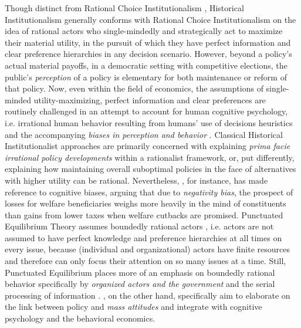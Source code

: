 \documentclass[11pt]{article}
\begin{document}
Though distinct from Rational Choice Institutionalism \parencite[see e.g.][]{Hall1996}, Historical Institutionalism generally conforms with Rational Choice Institutionalism on the idea of rational actors who single-mindedly and strategically act to maximize their material utility, in the pursuit of which they have perfect information and clear preference hierarchies in any decision scenario. However, beyond a policy's actual material payoffs, in a democratic setting with competitive elections, the public's \textit{perception} of a policy is elementary for both maintenance or reform of that policy. Now, even within the field of economics, the assumptions of single-minded utility-maximizing, perfect information and clear preferences are routinely challenged in an attempt to account for human cognitive psychology, i.e. irrational human behavior resulting from humans' use of decisions heuristics and the accompanying \textit{biases in perception and behavior} \parencite[see e.g.][]{Kahnemann1982}. Classical Historical Institutionalist approaches \parencite[e.g.][]{Pierson2000} are primarily concerned with explaining \textit{prima facie irrational policy developments} within a rationalist framework, or, put differently, explaining how maintaining overall suboptimal policies in the face of alternatives with higher utility can be rational. Nevertheless, \textcite[][]{Pierson1994}, for instance, has made reference to cognitive biases, arguing that due to \textit{negativity bias}, the prospect of losses for welfare beneficiaries weighs more heavily in the mind of constituents than gains from lower taxes when welfare cutbacks are promised. Punctuated Equilibrium Theory assumes boundedly rational actors \parencite[][]{Simon1955}, i.e. actors are not assumed to have perfect knowledge and preference hierarchies at all times on every issue, because (individual and organizational) actors have finite resources and therefore can only focus their attention on so many issues at a time. Still, Punctuated Equilibrium places more of an emphasis on boundedly rational behavior specifically by \textit{organized actors and the government} and the serial processing of information \parencite[see][p. 65]{Baumgartner2018}. \textcite[][]{Jacobs2014}, on the other hand, specifically aim to elaborate on the link between policy and \textit{mass attitudes} and integrate with cognitive psychology and the behavioral economics.
\end{document}
